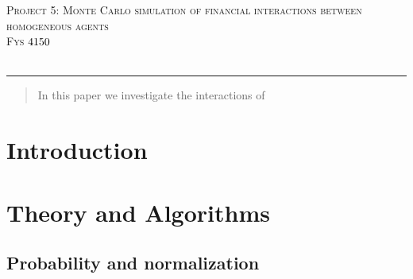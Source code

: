 \documentclass[a4paper,11pt]{article}
\newcommand*{\boisik}{\fontfamily{bsk}\selectfont} %
\begin{document}
{
\SetBgVshift{-1.2cm}
\SetBgHshift{-10.5cm}
$$\:$$
\begin{center}
	\vspace{0.2cm}%
	\fontsize{15}{15}\selectfont \textsc{ Project 5: Monte Carlo simulation of financial interactions between homogeneous agents}\\
	\fontsize{13}{13}\selectfont \textsc{Fys $\textnormal{{4150}}$ }\\
	\vspace{0.4cm}
	\fontsize{12}{12}\\
	\vspace{0.5cm}
\end{center}
	
\rule{\textwidth}{0.3pt}\par
		
\begin{abstract}
	In this paper we investigate the interactions of 
\end{abstract}



		
\section*{Introduction}







\section*{Theory and Algorithms}



\subsection{Probability and normalization}

}
\end{document}
